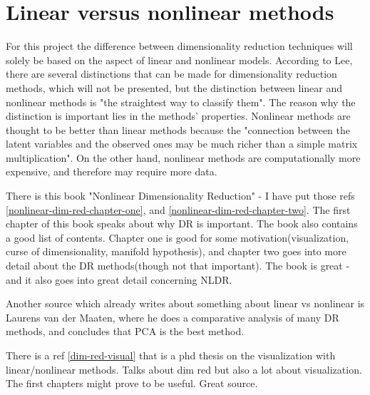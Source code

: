 \section{Linear versus nonlinear methods}\label{sec:linear-vs-nonlinear}
For this project the difference between dimensionality reduction techniques will solely be based on the aspect of linear and nonlinear models. According to Lee, there are several distinctions that can be made for dimensionality reduction methods, which will not be presented, but the distinction between linear and nonlinear methods is "the straightest way to classify them". The reason why the distinction is important lies in the methods' properties. Nonlinear methods are thought to be better than linear methods because the "connection between the latent variables and the observed ones may be much
richer than a simple matrix multiplication". On the other hand, nonlinear methods are computationally more expensive, and therefore may require more data. \cite{nonlinear-dim-red-chapter-two}


There is this book "Nonlinear Dimensionality Reduction" - I have put those refs \ref{nonlinear-dim-red-chapter-one}, and \ref{nonlinear-dim-red-chapter-two}. The first chapter of this book speaks about why DR is important. The book also contains a good list of contents.
Chapter one is good for some motivation(visualization, curse of dimensionality, manifold hypothesis), and chapter two goes into more detail about the DR methods(though not that important). The book is great - and it also goes into great detail concerning NLDR.


Another source which already writes about something about linear vs nonlinear is Laurens van der Maaten, where he does a comparative analysis of many DR methods, and concludes that PCA is the best method.


There is a ref \ref{dim-red-visual} that is a phd thesis on the visualization with linear/nonlinear methods. Talks about dim red but also a lot about visualization. The first chapters might prove to be useful. Great source.




